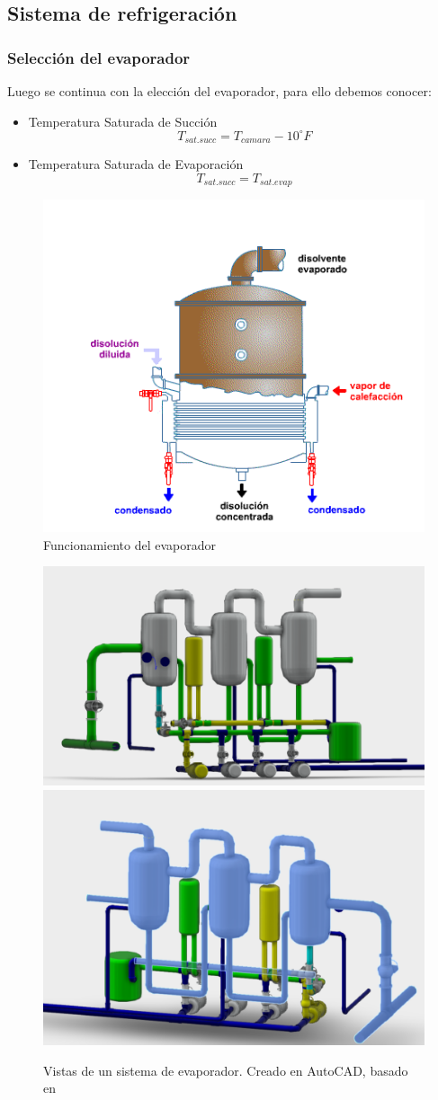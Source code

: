 \subsection{Sistema de refrigeración}
\subsubsection{Selección del evaporador}
Luego se continua con la elección del evaporador, para ello debemos conocer:
\begin{itemize}
	\item Temperatura Saturada de Succión \begin{equation}
		T_{sat.succ} = T_{camara} - 10^\circ F
	\end{equation}
	\item Temperatura Saturada de Evaporación \begin{equation}
		T_{sat.succ} =T_{sat.evap}
	\end{equation}	
\end{itemize}

\begin{figure}[H]
	\centering
	\includegraphics[width=0.5\linewidth]{figures/evap-func}
	\caption{Funcionamiento del evaporador}
	\label{fig:evap-func}
\end{figure}
\begin{figure}[H]
	\centering
	\includegraphics[width=0.576\linewidth]{figures/evap-cad1}\includegraphics[width=0.5\linewidth]{figures/evap-cad2}
	\caption{Vistas de un sistema de evaporador. Creado en AutoCAD, basado en} \cite{bibliocad}
	\label{fig:evap-cad}
\end{figure}
 
